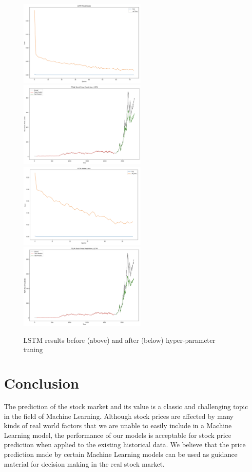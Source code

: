 \documentclass[12pt,a4paper]{article}
\begin{document}
\begin{figure}[h]
\centering
\caption{LSTM results before (above) and after (below) hyper-parameter tuning}
\includegraphics[width=2.5in]{./Figures/LSTM1.png}
\includegraphics[width=2.5in]{./Figures/LSTM2.png}
\includegraphics[width=2.5in]{./Figures/LSTM3.png}
\includegraphics[width=2.5in]{./Figures/LSTM4.png}
\end{figure}

\section{Conclusion}
The prediction of the stock market and its value is a classic and challenging topic in the field of Machine Learning. Although stock prices are affected by many kinds of real world factors that we are unable to easily include in a Machine Learning model, the performance of our models is acceptable for stock price prediction when applied to the existing historical data. We believe that the price prediction made by certain Machine Learning models can be used as guidance material for decision making in the real stock market. 
\end{document}
